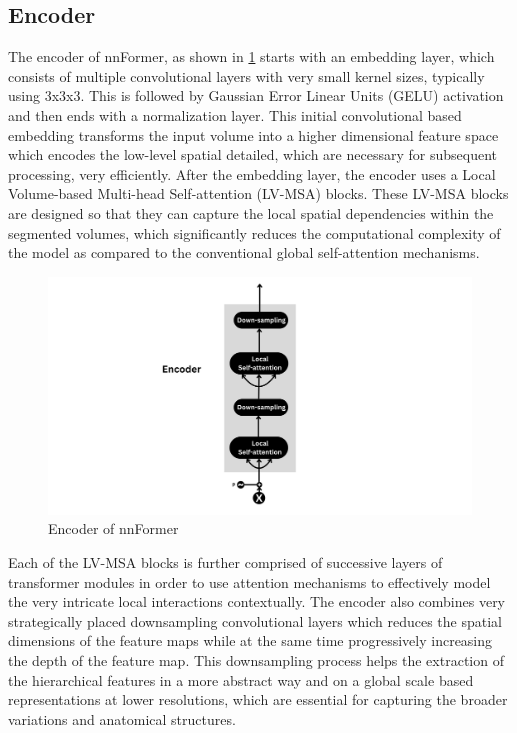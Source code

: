 \subsection{Encoder}
The encoder of nnFormer, as shown in \cref{Fig:encoder} starts with an embedding layer, which consists of multiple convolutional layers with very small kernel sizes, typically using 3x3x3. This is followed by Gaussian Error Linear Units (GELU) activation and then ends with a normalization layer. This initial convolutional based embedding transforms the input volume into a higher dimensional feature space which encodes the low-level spatial detailed, which are necessary for subsequent processing, very efficiently. After the embedding layer, the encoder uses a Local Volume-based Multi-head Self-attention (LV-MSA) blocks. These LV-MSA blocks are designed so that they can capture the local spatial dependencies within the segmented volumes, which significantly reduces the computational complexity of the model as compared to the conventional global self-attention mechanisms. 

\begin{figure}[htb!] %
\centering
\centering
\includegraphics[width=1\textwidth]{images/Encoder.png}
\caption{\centering Encoder of nnFormer}
\label{Fig:encoder}
\end{figure}

Each of the LV-MSA blocks is further comprised of successive layers of transformer modules in order to use attention mechanisms to effectively model the very intricate local interactions contextually. The encoder also combines very strategically placed downsampling convolutional layers which reduces the spatial dimensions of the feature maps while at the same time progressively increasing the depth of the feature map. This downsampling process helps the extraction of the hierarchical features in a more abstract way and on a global scale based representations at lower resolutions, which are essential for capturing the broader variations and anatomical structures.

